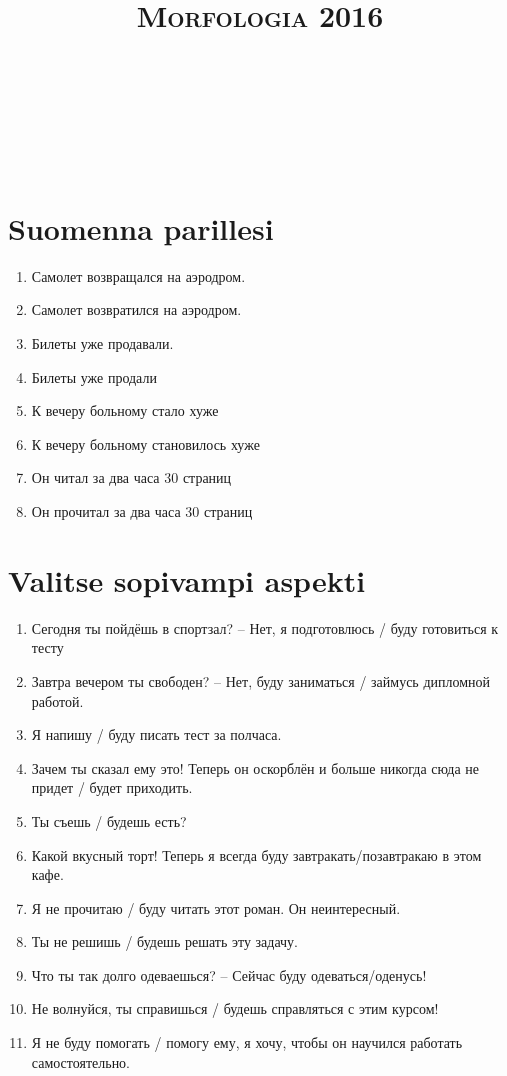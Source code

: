 \documentclass[paper=a4, fontsize=11pt]{scrartcl}
\title{	
\normalfont \normalsize 
\textsc{Morfologia 2016} \\ [25pt] 
\horrule{0.5pt} \\[0.4cm] 
\huge  \\ 
\horrule{2pt} \\[0.5cm] 
}
\date{}
\begin{document}
\onehalfspacing

\section{Suomenna parillesi} 

\begin{enumerate}
    \item Самолет возвращался на аэродром.
    \item Самолет возвратился на аэродром.
    \item Билеты уже продавали.
    \item Билеты уже продали
    \item К вечеру больному стало хуже
    \item К вечеру больному становилось хуже
    \item Он читал за два часа 30 страниц
    \item Он прочитал за два часа 30 страниц
\end{enumerate}


\section{Valitse sopivampi aspekti} 

\begin{enumerate}
    \item Сегодня ты пойдёшь в спортзал? -- Нет, я подготовлюсь / буду готовиться к тесту
    \item Завтра вечером ты свободен? -- Нет, буду заниматься / займусь дипломной работой.
    \item Я напишу / буду писать тест за полчаса.
    \item Зачем ты сказал ему это! Теперь он оскорблён и больше никогда сюда не придет / будет приходить.
    \item Ты съешь / будешь есть?
    \item Какой вкусный торт! Теперь я всегда буду завтракать/позавтракаю в этом кафе.
    \item Я не прочитаю / буду читать этот роман. Он неинтересный.
    \item Ты не решишь / будешь решать эту задачу.
    \item Что ты так долго одеваешься?  -- Сейчас буду одеваться/оденусь!
    \item Не волнуйся, ты справишься / будешь справляться с этим курсом!
    \item Я не буду помогать / помогу ему, я хочу, чтобы он научился работать самостоятельно.
\end{enumerate}
\end{document}
